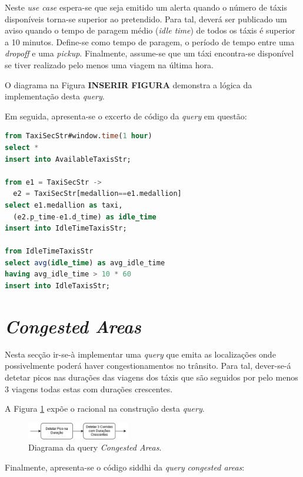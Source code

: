 \documentclass[article]{IEEEtran}
\begin{document}
Neste \textit{use case} espera-se que seja emitido um alerta quando o número de táxis disponíveis torna-se superior ao pretendido. Para tal, deverá ser publicado um aviso quando o tempo de paragem médio (\textit{idle time}) de todos os táxis é superior a 10 minutos. Define-se como tempo de paragem, o período de tempo entre uma \textit{dropoff} e uma \textit{pickup}. Finalmente, assume-se que um táxi encontra-se disponível se tiver realizado pelo menos uma viagem na última hora.

O diagrama na Figura \textbf{INSERIR FIGURA} demonstra a lógica da implementação desta \textit{query}.

Em seguida, apresenta-se o excerto de código da \textit{query} em questão:
\begin{lstlisting}[language=SQL]
from TaxiSecStr#window.time(1 hour)
select *
insert into AvailableTaxisStr;

from e1 = TaxiSecStr -> 
  e2 = TaxiSecStr[medallion==e1.medallion]
select e1.medallion as taxi,
  (e2.p_time-e1.d_time) as idle_time
insert into IdleTimeTaxisStr;

from IdleTimeTaxisStr
select avg(idle_time) as avg_idle_time
having avg_idle_time > 10 * 60
insert into IdleTaxisStr;
\end{lstlisting}


\section{\textit{Congested Areas}}

Nesta secção ir-se-à implementar uma \textit{query} que emita as localizações onde possivelmente poderá haver congestionamentos no trânsito. Para tal, dever-se-á detetar picos nas durações das viagens dos táxis que são seguidos por pelo menos 3 viagens todas estas com durações crescentes.

A Figura \ref{fig:congestedAreasDiagram} expõe o racional na construção desta \textit{query}.

\begin{figure}[hbtp]
    \centering
        \includegraphics[width=0.4\textwidth]{images/congestedAreas}
    \caption{Diagrama da query \textit{Congested Areas}.}
    \label{fig:congestedAreasDiagram}
\end{figure}

Finalmente, apresenta-se o código siddhi da \textit{query} \textit{congested areas}:
\end{document}
